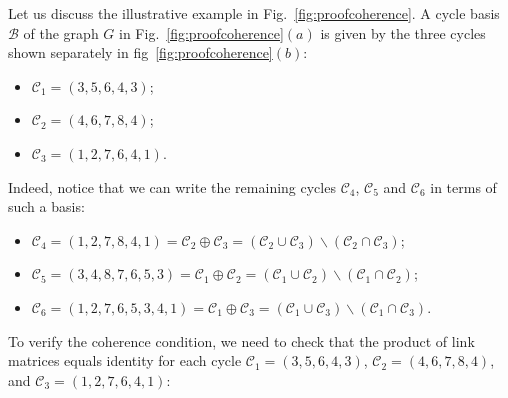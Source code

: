 \documentclass[aps,showpacs,preprintnumbers,amsmath,amssymb,twocolumn,superscriptaddress,floatfix,nofootinbib,10pt,pre]{revtex4-1}
\begin{document}
Let us discuss the illustrative example in Fig.~\ref{fig:proofcoherence}. A cycle basis $\mathcal{B}$ of the graph $G$ in Fig.~\ref{fig:proofcoherence}$(a)$ is given by the three cycles shown separately in fig~\ref{fig:proofcoherence}$(b)$:
\begin{itemize}
    \item $\mathcal{C}_1 = (3, 5, 6, 4, 3)$;
    \item $\mathcal{C}_2 = (4, 6, 7, 8, 4)$;  
    \item $\mathcal C_3=(1,2,7,6,4,1)$.
\end{itemize}
Indeed, notice that we can write the remaining cycles $\mathcal C_4$, $\mathcal C_5$ and $\mathcal C_6$ in terms of such a basis:
\begin{itemize}
    \item $\mathcal{C}_4 = (1,2,7,8,4,1) = \mathcal C_2\oplus\mathcal C_3 = (\mathcal C_2\cup\mathcal C_3)\backslash(\mathcal C_2\cap\mathcal C_3)$;
    \item $\mathcal{C}_5 = (3,4,8,7,6,5,3) = \mathcal C_1\oplus\mathcal C_2 = (\mathcal C_1\cup\mathcal C_2)\backslash(\mathcal C_1\cap\mathcal C_2)$;  
    \item $\mathcal{C}_6 = (1,2,7,6,5,3,4,1) = \mathcal C_1\oplus\mathcal C_3 = (\mathcal C_1\cup\mathcal C_3)\backslash(\mathcal C_1\cap\mathcal C_3)$.
\end{itemize}
To verify the coherence condition, we need to check that the product of link matrices equals identity for each cycle $\mathcal C_1=(3,5,6,4,3)$, $\mathcal C_2=(4,6,7,8,4)$, and $\mathcal C_3=(1,2,7,6,4,1)$:
\end{document}

